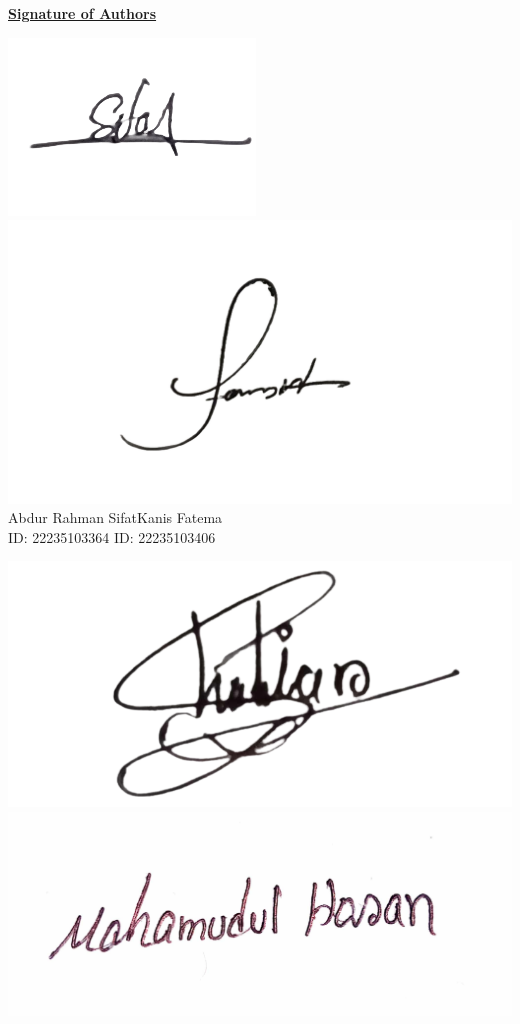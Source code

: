\begin{flushleft}

\textbf{\underline{Signature of Authors}} \null\hfill  

\vspace{10mm}

\underline{\includegraphics[scale=0.5]{Sign/sifat.png}} \null\hfill 
\underline{\includegraphics[scale=0.13]{Sign/saj.png}}\\
Abdur Rahman Sifat\null\hfill   Kanis Fatema \\
ID: 22235103364 \null\hfill  ID: 22235103406 \\

\vspace{5mm}

\underline{\includegraphics[scale=0.18]{Sign/sharir.png}} \null\hfill 
\underline{\includegraphics[scale=0.07]{Sign/Mahamudul.png}}\\


\end{flushleft}

